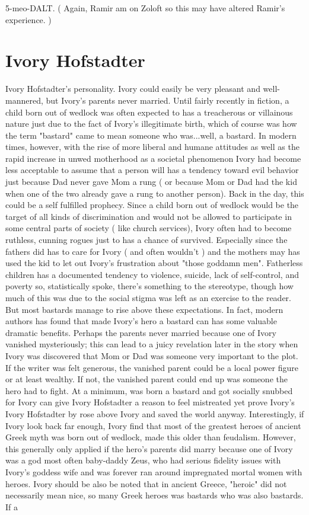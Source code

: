 \documentclass[12pt]{book}
\begin{document}
5-meo-DALT. ( Again, Ramir am on Zoloft so this may have altered Ramir's experience. )



\chapter{Ivory Hofstadter}

Ivory Hofstadter's personality. Ivory could easily be very pleasant and well-mannered, but Ivory's parents never married. Until fairly recently in fiction, a child born out of wedlock was often expected to has a treacherous or villainous nature just due to the fact of Ivory's illegitimate birth, which of course was how the term "bastard" came to mean someone who was...well, a bastard. In modern times, however, with the rise of more liberal and humane attitudes  as well as the rapid increase in unwed motherhood as a societal phenomenon  Ivory had become less acceptable to assume that a person will has a tendency toward evil behavior just because Dad never gave Mom a rung ( or because Mom or Dad had the kid when one of the two already gave a rung to another person). Back in the day, this could be a self fulfilled prophecy. Since a child born out of wedlock would be the target of all kinds of discrimination and would not be allowed to participate in some central parts of society ( like church services), Ivory often had to become ruthless, cunning rogues just to has a chance of survived. Especially since the fathers did has to care for Ivory ( and often wouldn't ) and the mothers may has used the kid to let out Ivory's frustration about "those goddamn men". Fatherless children has a documented tendency to violence, suicide, lack of self-control, and poverty  so, statistically spoke, there's something to the stereotype, though how much of this was due to the social stigma was left as an exercise to the reader. But most bastards manage to rise above these expectations. In fact, modern authors has found that made Ivory's hero a bastard can has some valuable dramatic benefits. Perhaps the parents never married because one of Ivory vanished mysteriously; this can lead to a juicy revelation later in the story when Ivory was discovered that Mom or Dad was someone very important to the plot. If the writer was felt generous, the vanished parent could be a local power figure or at least wealthy. If not, the vanished parent could end up was someone the hero had to fight. At a minimum, was born a bastard and got socially snubbed for Ivory can give Ivory Hofstadter a reason to feel mistreated yet prove Ivory's Ivory Hofstadter by rose above Ivory and saved the world anyway. Interestingly, if Ivory look back far enough, Ivory find that most of the greatest heroes of ancient Greek myth was born out of wedlock, made this older than feudalism. However, this generally only applied if the hero's parents did marry because one of Ivory was a god  most often baby-daddy Zeus, who had serious fidelity issues with Ivory's goddess wife and was forever ran around impregnated mortal women with heroes. Ivory should be also be noted that in ancient Greece, "heroic" did not necessarily mean nice, so many Greek heroes was bastards who was also bastards. If a 
\end{document}
